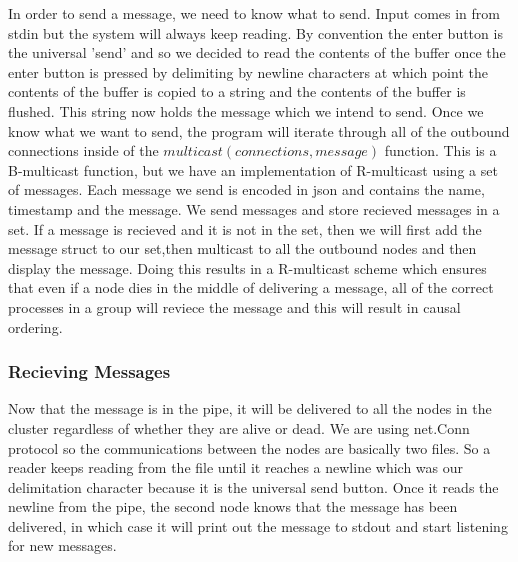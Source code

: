 \documentclass{article}
\begin{document}
				In order to send a message, we need to know what to send. 
				Input comes in from stdin but the system will always keep 
				reading. By convention the enter button is the universal
				'send' and so we decided to read the contents of the buffer
				once the enter button is pressed by delimiting by newline 
				characters at which point the contents of the buffer is copied 
				to a string and the contents of the buffer is flushed. This 
				string now holds the message which we intend to send. Once we know 
				what we want to send, the program will iterate through all of
				the outbound connections inside of the $multicast(connections, 
				message)$ function. This is a B-multicast function, but we have
				an implementation of R-multicast using a set of messages. Each 
				message we send is encoded in json and contains the name, timestamp
				and the message. We send messages and store recieved messages
				in a set. If a message is recieved and it is not in the set, 
				then we will first add the message struct to our set,then
				multicast to all the outbound nodes and then display the message. 
				Doing this results in a R-multicast scheme which ensures that even
				if a node dies in the middle of delivering a message, all of the
				correct processes in a group will reviece the message and this 
				will result in causal ordering. 
			\subsubsection{Recieving Messages}
				Now that the message is in the pipe, it will be delivered 
				to all the nodes in the cluster regardless of whether they
				are alive or dead. We are using net.Conn protocol so the 
				communications between the nodes are basically two files. 
				So a reader keeps reading from the file until it reaches a 
				newline which was our delimitation character because it is 
				the universal send button. Once it reads the newline from 
				the pipe, the second node knows that the message has been 
				delivered, in which case it will print out the message to 
				stdout and start listening for new messages. 
\end{document}
